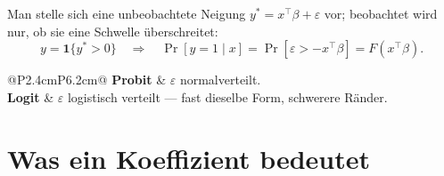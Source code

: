 \begin{merksatz}
Man stelle sich eine unbeobachtete Neigung $y^{*} = x^{\top}\beta + \varepsilon$ vor; beobachtet wird nur, ob sie eine Schwelle überschreitet:
\[ y = \mathbf 1\{y^{*} > 0\} \quad\Longrightarrow\quad \Pr[y=1\mid x] = \Pr[\varepsilon > -x^{\top}\beta] = F(x^{\top}\beta) . \]

\begin{center}
{\small
\renewcommand{\arraystretch}{1.5}
\begin{tabular}{@{}P{2.4cm}P{6.2cm}@{}}
\toprule
\textbf{Probit} & $\varepsilon$ normalverteilt.\\
\textbf{Logit} & $\varepsilon$ logistisch verteilt --- fast dieselbe Form, schwerere Ränder.\\
\bottomrule
\end{tabular}}
\end{center}

\begin{center}
\begin{minipage}{0.88\textwidth}
\end{minipage}
\end{center}
\end{merksatz}

\section{Was ein Koeffizient bedeutet}

